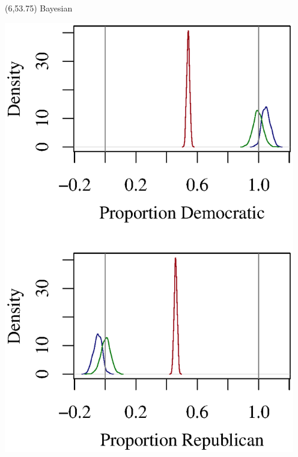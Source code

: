 \documentclass{article}
\begin{document}
\begin{textblock}{6}(6,53.75)
\center \qquad Bayesian
\begin{center}
\includegraphics[width=5in]{eiBayes.regress.eps}
\end{center}
\end{textblock}
\end{document}
